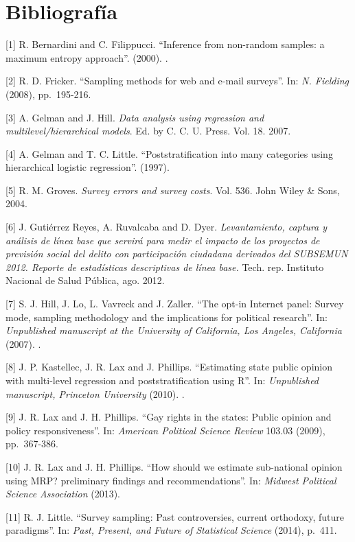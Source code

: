 \documentclass[]{article}
\begin{document}
\pagebreak

\section{Bibliografía}\label{bibliografia}

{[}1{]} R. Bernardini and C. Filippucci. ``Inference from non-random
samples: a maximum entropy approach''. (2000). .

{[}2{]} R. D. Fricker. ``Sampling methods for web and e-mail surveys''.
In: \emph{N. Fielding} (2008), pp.~195-216.

{[}3{]} A. Gelman and J. Hill. \emph{Data analysis using regression and
multilevel/hierarchical models}. Ed. by C. C. U. Press. Vol. 18. 2007.

{[}4{]} A. Gelman and T. C. Little. ``Poststratification into many
categories using hierarchical logistic regression''. (1997).

{[}5{]} R. M. Groves. \emph{Survey errors and survey costs}. Vol. 536.
John Wiley \& Sons, 2004.

{[}6{]} J. Gutiérrez Reyes, A. Ruvalcaba and D. Dyer.
\emph{Levantamiento, captura y análisis de línea base que servirá para
medir el impacto de los proyectos de previsión social del delito con
participación ciudadana derivados del SUBSEMUN 2012. Reporte de
estadísticas descriptivas de línea base.} Tech. rep. Instituto Nacional
de Salud Pública, ago. 2012.

{[}7{]} S. J. Hill, J. Lo, L. Vavreck and J. Zaller. ``The opt-in
Internet panel: Survey mode, sampling methodology and the implications
for political research''. In: \emph{Unpublished manuscript at the
University of California, Los Angeles, California} (2007). .

{[}8{]} J. P. Kastellec, J. R. Lax and J. Phillips. ``Estimating state
public opinion with multi-level regression and poststratification using
R''. In: \emph{Unpublished manuscript, Princeton University} (2010). .

{[}9{]} J. R. Lax and J. H. Phillips. ``Gay rights in the states: Public
opinion and policy responsiveness''. In: \emph{American Political
Science Review} 103.03 (2009), pp.~367-386.

{[}10{]} J. R. Lax and J. H. Phillips. ``How should we estimate
sub-national opinion using MRP? preliminary findings and
recommendations''. In: \emph{Midwest Political Science Association}
(2013).

{[}11{]} R. J. Little. ``Survey sampling: Past controversies, current
orthodoxy, future paradigms''. In: \emph{Past, Present, and Future of
Statistical Science} (2014), p.~411.
\end{document}
